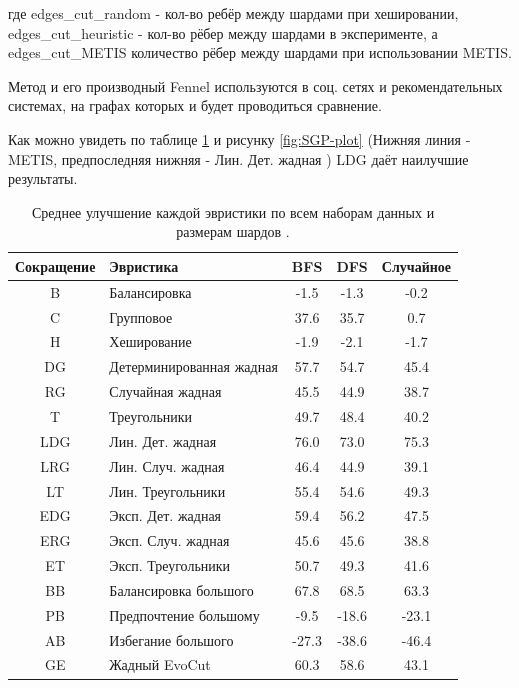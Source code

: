 где edges\_cut\_random - кол-во ребёр между шардами при хешировании, edges\_cut\_heuristic - кол-во рёбер между шардами в эксперименте, а edges\_cut\_METIS количество рёбер между шардами при использовании METIS.

Метод и его производный Fennel \cite{Fennel} используются в соц. сетях и рекомендательных системах, на графах которых и будет проводиться сравнение. 

Как можно увидеть по таблице \ref{tbl:SGP-euristics} и рисунку \ref{fig:SGP-plot} (Нижняя линия - METIS, предпоследняя нижняя - Лин. Дет. жадная \cite{SGP}) LDG даёт наилучшие результаты. 
\vspace{-8pt}
\begin{table}[H]
\centering
\caption{Среднее улучшение каждой эвристики по всем наборам данных и размерам шардов \cite{SGP}.}
\begin{tabular*}{\textwidth}{@{\extracolsep{\fill}}|c|l|c|c|c|}
\hline
Сокращение & Эвристика & BFS & DFS & Случайное \\
\hline
B & Балансировка & -1.5 & -1.3 & -0.2 \\ \hline
C & Групповое & 37.6 & 35.7 & 0.7 \\ \hline
H & Хеширование & -1.9 & -2.1 & -1.7 \\ \hline
DG & Детерминированная жадная & 57.7 & 54.7 & 45.4 \\ \hline
RG & Случайная жадная & 45.5 & 44.9 & 38.7 \\ \hline
T & Треугольники & 49.7 & 48.4 & 40.2 \\ \hline
LDG & Лин. Дет. жадная & 76.0 & 73.0 & 75.3 \\ \hline
LRG & Лин. Случ. жадная & 46.4 & 44.9 & 39.1 \\ \hline
LT & Лин. Треугольники & 55.4 & 54.6 & 49.3 \\ \hline
EDG & Эксп. Дет. жадная & 59.4 & 56.2 & 47.5 \\ \hline
ERG & Эксп. Случ. жадная & 45.6 & 45.6 & 38.8 \\ \hline
ET & Эксп. Треугольники & 50.7 & 49.3 & 41.6 \\ \hline
BB & Балансировка большого & 67.8 & 68.5 & 63.3 \\ \hline
PB & Предпочтение большому & -9.5 & -18.6 & -23.1 \\ \hline
AB & Избегание большого & -27.3 & -38.6 & -46.4 \\ \hline
GE & Жадный EvoCut & 60.3 & 58.6 & 43.1 \\
\hline
\end{tabular*}
\label{tbl:SGP-euristics}
\end{table}

